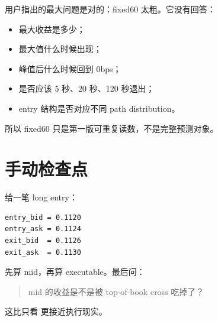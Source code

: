 用户指出的最大问题是对的：fixed60 太粗。它没有回答：

\begin{itemize}[leftmargin=2em]
  \item 最大收益是多少；
  \item 最大值什么时候出现；
  \item 峰值后什么时候回到 0bps；
  \item 是否应该 5 秒、20 秒、120 秒退出；
  \item entry 结构是否对应不同 path distribution。
\end{itemize}

所以 fixed60 只是第一版可重复读数，不是完整预测对象。

\section{手动检查点}

给一笔 long entry：

\begin{lstlisting}
entry_bid = 0.1120
entry_ask = 0.1124
exit_bid  = 0.1126
exit_ask  = 0.1130
\end{lstlisting}

先算 mid，再算 executable。最后问：

\begin{quote}
mid 的收益是不是被 top-of-book cross 吃掉了？
\end{quote}

这比只看  更接近执行现实。

